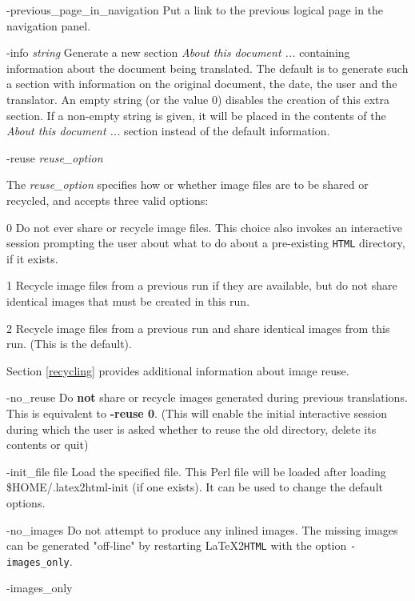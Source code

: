 \documentclass[dvips]{article}
\newcommand{\latextohtml}{\LaTeX 2\texttt{HTML}}
\begin{document}
\begin{htmllist}
\item [-previous\_page\_in\_navigation]
Put a link to the previous logical page in the navigation panel.
\item [-info \textsl{string}]
Generate a new section \emph{About this document ...} containing information
about the document being translated. The default is to generate such a section 
with information on the original document, the date, the user and the
translator.
An empty string (or the value 0) disables the creation of this extra
section. If a non-empty string is given, it will be placed in the contents of the 
\emph{About this document ...} section instead of the default information.
\item [-reuse \textsl{reuse\_option}]
\begin{changebar} 
The \textsl{reuse\_option} specifies how or whether image files are to be shared
or recycled, and accepts three valid options:
\begin{htmllist}
\item [0] Do not ever share or recycle image files. This choice also invokes an
	interactive session prompting the user about what to do about
	a pre-existing \texttt{HTML} directory, if it exists.
\item [1] Recycle image files from a previous run if they are available,
	but do not share identical images that must be created in this run.
\item [2] Recycle image files from a previous run and share identical
	images from this run.  (This is the default).
\end{htmllist}
Section \ref{recycling} provides additional information about image reuse.
\item [-no\_reuse]
Do \textbf{not} share or recycle images generated during previous translations.
This is equivalent to \textbf{-reuse 0}.
(This will enable the initial interactive session during which the user is
asked whether to reuse the old directory, delete its contents or quit)
\end{changebar}
\item [-init\_file file]
Load the specified file. This Perl file will be loaded after loading 
\$HOME/.latex2html-init (if one exists). It can be used to change the 
default options.
\item [ -no\_images]
Do not attempt to produce any inlined images. 
The missing images can be generated "off-line" by restarting \latextohtml{}
with the option \texttt{-images\_only}.
\item [ -images\_only]

\end{htmllist}
\end{document}
